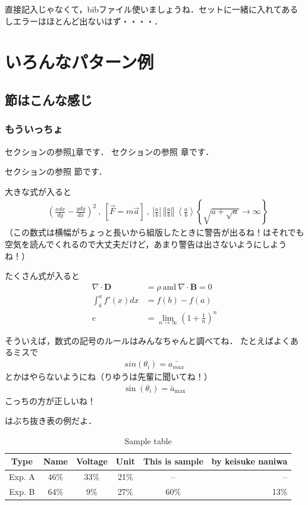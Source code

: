 \documentclass[platex,dvipdfmx]{jlreq}%
\numberwithin{equation}{section}%
\begin{document}
直接記入じゃなくて，bibファイル使いましょうね．セットに一緒に入れてあるしエラーはほとんど出ないはず・・・・．

\section{いろんなパターン例}\label{sec:基本}
\subsection{節はこんな感じ}\label{sec:基本2}
\subsubsection{もういっちょ}

セクションの参照\ref{sec:基本}章です．
セクションの参照 章です．

セクションの参照 節です．

大きな式が入ると
\begin{align}
 & \left(\frac{xdx}{dy} -\frac{ydy}{dx}\right)^{2} \ ,\ \left[\vec{F} =m\vec{a}\right] \ ,\ \left| \frac{a}{b}\right| \ \left\Vert \frac{a}{b}\right\Vert \ \left< \frac{a}{b}\right> \left\{\sqrt{a+\sqrt{a}}\rightarrow \infty \right\} 
\end{align}%
（この数式は横幅がちょっと長いから組版したときに警告が出るね！\LaTeXe はそれでも空気を読んでくれるので大丈夫だけど，あまり警告は出さないようにしようね！）

たくさん式が入ると
\begin{align}
 \nabla \cdot \mathbf{D} & =\rho \ \mathrm{and} \ \nabla \cdot \mathbf{B} =0\ \\
 \int ^{a}_{b} f'( x) dx & = f( b) -f( a)\\
 e &= \lim\limits _{n\rightarrow \infty }\left( 1+\frac{1}{n}\right)^{n}
\end{align}

そういえば，数式の記号のルールはみんなちゃんと調べてね．
たとえばよくあるミスで
\begin{align}
  sin(\theta_i) = \bar{a_{max}}
\end{align}
とかはやらないようにね（りゆうは先輩に聞いてね！）
\begin{align}
  \sin(\theta_i) = \bar{a}_{\textrm{max}}
\end{align}
こっちの方が正しいね！



はぶち抜き表の例だよ．

\begin{table}[tb]
  \caption{Sample table}
   \label{tab:test}
   \centering
   \begin{tabular}{cccccr}\hline
    Type & Name & Voltage & Unit & This is sample & by keisuke naniwa\\ \hline \hline
   Exp. A & 46\%& 33\%& 21\%& --& --\\ 
   Exp. B & 64\%& 9\%& 27\%& 60\%& 13\%\\ \hline    
   \end{tabular}
\end{table}
\end{document}
